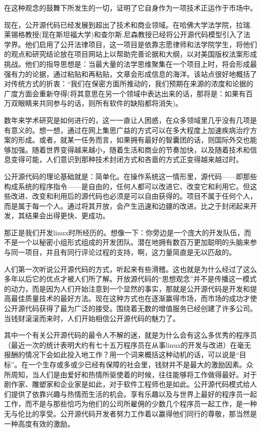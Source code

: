 在这种观念的鼓舞下所发生的一切，证明了它自身作为一项技术正运作于市场中。

现在，公开源代码已经发展到超出了技术和商业领域。在哈佛大学法学院，拉瑞.莱锡格教授(现在斯坦福大学)和查尔斯.尼森教授已经将公开源代码模型引入了法学界。他们启用了公开法律项目，这一项目是依靠志愿律师和法学院学生，将他们的观点和研究结论放在项目网站上以帮助完善论据和大纲，以对美国版权法案形成挑战。他们的指导思想是：当最大量的法学思维聚集在一个项目上时，将会形成最强有力的论据，通过粘贴和再粘贴，文章会形成信息的海洋。该站点很好地概括了对传统方式的折衷：“我们在保密方面所推动的，我们预期在来源的浓度和论据的广度方面会重新夺得(将其意思在另一个领域中表达出来的话，那将是：如果有百万双眼睛来共同参与的话，则所有软件的缺陷都将消失)。

数年来学术研究是如何进行的，这一一直让人困惑，在众多领域里几乎没有几项是有意义的。想一想，通过在网上集思广益的方式可以在多大程度上加速疾病治疗方案的形成。或者，就某一任务而言，如果拥有最好的智囊团的话，则国际外交也能够加强。随着世界变得越来越小，随着生活和商业的节奏加快，以及随着技术和信息变得可能，人们意识到那种技术封闭方式和吝啬的方式正变得越来越过时。

公开源代码的理论基础就是：简单化。在操作系统这一情形里，源代码——即那些构成系统的程序指令——是自由的，任何人都可以改进它、改变它和利用它。但这些改进、改变和利用后的源代码也必须是可以自由获得的。项目不属于任何个人，而是属于每一个人。通过将其开放，会产生迅速和边疆的改进。比之于封闭起来开发，其结果会出得更快、更成功。

那正是我们开发linux时所经历的。想像一下：你旁边是一个庞大的开发队伍，而不是一个以秘密小组形式组成的开发团队。潜在地拥有数百万更加聪明的头脑来参与同一项目，并且有同行评论过程的支持，啊，这力量简直是无以匹敌的。

人们第一次听说公开源代码的方式，听起来有些滑稽。这也就是为什么经过了这么多年以后它的优点才被人们所了解。开放源代码的“思想观念”并不是传播这一模式的动力，而是因为人们开始注意到一个显然的事实，那就是公开源代码是开发和提高最佳质量技术的最好方法。现在这种方式也在逐渐赢得市场，而市场的成功才使公开源代码获得了最为广泛的接受。围绕着无数的增值服务已经创建了许多公司。当钱财滚滚而来时，人们开始相信公开源代码的魅力了。

其中一个有关公开源代码的最令人不解的迷，就是为什么会有这么多优秀的程序员（最近一次的统计表明大约有七十五万程序员在从事linux的开发与改进）在毫无报酬的情况下会如此投入地工作？用一个词来概括这种动机的话，可以说是“目标”。在一个生存或多或少已经有保障的社会里，钱财并不是最大的激励因素。众所周知，当人们是由爱好和热情所驱使着的时候，往往能够将工作做得最好。对于剧作家、雕塑家和企业家是如此，对于软件工程师也是如此。公开源代码模式给人们提供了依靠兴趣与热情而生活的机会。享有乐趣以及与世界上最好的程序员一起工作，而不是与那些恰巧为他们的公司所雇佣的少数几个程序员一起工作，是一种无与伦比的享受。公开源代码开发者努力工作着以赢得他们同行的尊敬，那当然是一种高度有效的激励。

